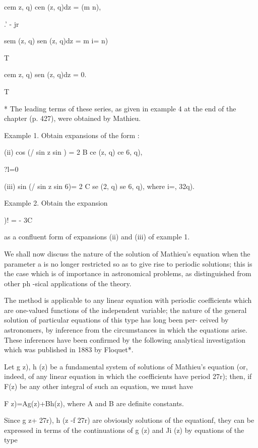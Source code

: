 cem z, q) cen (z, q)dz = (m n),

.' - jr

sem (z, q) sen (z, q)dz = m i= n)

T

cem z, q) sen (z, q)dz = 0.

T

* The leading terms of these series, as given in example 4 at the end
of the chapter (p. 427), were obtained by Mathieu.

%
%

Example 1. Obtain expansions of the form :

(ii) cos (/ sin z sin ) = 2 B ce (z, q) ce 6, q),

?l=0

(iii) sin (/ sin z sin 6)= 2 C se (2, q) se 6, q), where i=, 32q).

Example 2. Obtain the expansion

)! = - 3C

as a confluent form of expansions (ii) and (iii) of example 1.


We shall now discuss the nature of the solution of Mathieu's equation
when the parameter a is no longer restricted so as to give rise to
periodic solutions; this is the case which is of importance in
astronomical problems, as distinguished from other ph -sical
applications of the theory.

The method is applicable to any linear equation with periodic
coefficients which are one-valued functions of the independent
variable; the nature of the general solution of particular equations
of this type has long been per- ceived by astronomers, by inference
from the circumstances in which the equations arise. These inferences
have been confirmed by the following analytical investigation which
was published in 1883 by Floquet*.

Let g z), h (z) be a fundamental system of solutions of Mathieu's
equation (or, indeed, of any linear equation in which the coefficients
have period 27r); then, if F(z) be any other integral of such an
equation, we must have

F z)=Ag(z)+Bh(z), where A and B are definite constants.

Since g z+ 27r), h (z -f 27r) are obviously solutions of the
equationf, they can be expressed in terms of the continuations of g
(z) and Ji (z) by equations of the type

